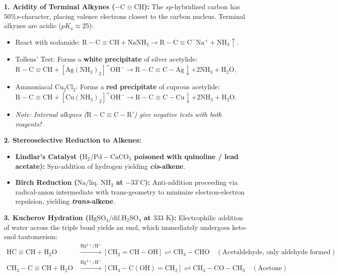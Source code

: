 \documentclass[10pt,a4paper]{article}
\begin{document}
\begin{conceptbox}
\textbf{1. Acidity of Terminal Alkynes ($-\mathrm{C\equiv CH}$):}
The $sp$-hybridized carbon has $50\% s$-character, placing valence electrons closest to the carbon nucleus. Terminal alkynes are acidic ($pK_a \approx 25$):
\begin{itemize}
  \item React with sodamide: $\mathrm{R-C\equiv CH} + \mathrm{NaNH_2} \to \mathrm{R-C\equiv C^-Na^+} + \mathrm{NH_3}\uparrow$.
  \item Tollens' Test: Forms a \textbf{white precipitate} of silver acetylide: $\mathrm{R-C\equiv CH} + \mathrm{[Ag(NH_3)_2]^+OH^-} \to \mathrm{R-C\equiv C-Ag}\downarrow + 2\mathrm{NH_3} + \mathrm{H_2O}$.
  \item Ammoniacal $\mathrm{Cu_2Cl_2}$: Forms a \textbf{red precipitate} of cuprous acetylide: $\mathrm{R-C\equiv CH} + \mathrm{[Cu(NH_3)_2]^+OH^-} \to \mathrm{R-C\equiv C-Cu}\downarrow + 2\mathrm{NH_3} + \mathrm{H_2O}$.
  \item \textit{Note: Internal alkynes ($\mathrm{R-C\equiv C-R'}$) give negative tests with both reagents!}
\end{itemize}
\textbf{2. Stereoselective Reduction to Alkenes:}
\begin{itemize}
  \item \textbf{Lindlar's Catalyst ($\mathrm{H_2 / Pd-CaCO_3}$ poisoned with quinoline / lead acetate):} Syn-addition of hydrogen yielding \textbf{\textit{cis}-alkene}.
  \item \textbf{Birch Reduction ($\mathrm{Na / \text{liq. } NH_3}$ at $-33^\circ\text{C}$):} Anti-addition proceeding via radical-anion intermediate with trans-geometry to minimize electron-electron repulsion, yielding \textbf{\textit{trans}-alkene}.
\end{itemize}
\textbf{3. Kucherov Hydration ($\mathrm{HgSO_4 / dil. H_2SO_4}$ at $333\text{ K}$):}
Electrophilic addition of water across the triple bond yields an enol, which immediately undergoes keto-enol tautomerism:
\begin{equation}
  \begin{aligned}
    \mathrm{HC\equiv CH} + \mathrm{H_2O} &\xrightarrow{\mathrm{Hg^{2+}/H^+}} [\mathrm{CH_2=CH-OH}] \rightleftharpoons \mathbf{\mathrm{CH_3-CHO}} \quad (\text{Acetaldehyde, only aldehyde formed})\\
    \mathrm{CH_3-C\equiv CH} + \mathrm{H_2O} &\xrightarrow{\mathrm{Hg^{2+}/H^+}} [\mathrm{CH_3-C(OH)=CH_2}] \rightleftharpoons \mathbf{\mathrm{CH_3-CO-CH_3}} \quad (\text{Acetone})
  \end{aligned}
\end{equation}
\end{conceptbox}
\end{document}
